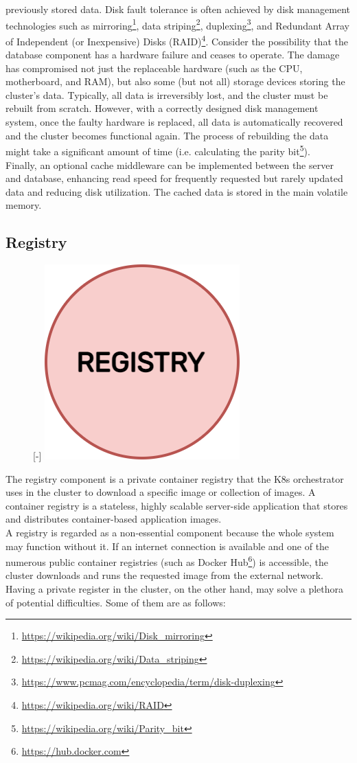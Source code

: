 previously stored data. Disk fault tolerance is often achieved by disk
management technologies such as mirroring\footnote{\url{https://wikipedia.org/wiki/Disk_mirroring}},
data striping\footnote{\url{https://wikipedia.org/wiki/Data_striping}},
duplexing\footnote{\url{https://www.pcmag.com/encyclopedia/term/disk-duplexing}},
and Redundant Array of Independent (or Inexpensive) Disks (RAID)\footnote{\url{https://wikipedia.org/wiki/RAID}}\cite{disk_management_technologies}.
Consider the possibility that the database component has a hardware failure and ceases
to operate. The damage has compromised not just the replaceable hardware (such as
the CPU, motherboard, and RAM), but also some (but not all) storage devices storing
the cluster's data. Typically, all data is irreversibly lost, and the cluster
must be rebuilt from scratch. However, with a correctly designed disk management
system, once the faulty hardware is replaced, all data is automatically
recovered and the cluster becomes functional again. The process of rebuilding the
data might take a significant amount of time (i.e. calculating the parity bit\footnote{\url{https://wikipedia.org/wiki/Parity_bit}}).
\\ %
Finally, an optional cache middleware can be implemented between the server and database,
enhancing read speed for frequently requested but rarely updated data and
reducing disk utilization. The cached data is stored in the main volatile memory.

\subsection{Registry}
\label{subsec:architecture_components_registry}

\begin{figure} %
  \raisebox{0pt}[\dimexpr\height-\baselineskip\relax]{\centering
  \includegraphics[width=.2\textwidth]{images/recluster/registry.png}}
\end{figure}


The registry component is a private container registry that the K8s orchestrator
uses in the cluster to download a specific image or collection of images. A container
registry is a stateless, highly scalable server-side application that stores and
distributes container-based application images\cite{container_registry}. \\ %
A registry is regarded as a non-essential component because the whole system may
function without it. If an internet connection is available and one of the
numerous public container registries (such as Docker Hub\footnote{\url{https://hub.docker.com}})
is accessible, the cluster downloads and runs the requested image from the external
network. Having a private register in the cluster, on the other hand, may solve
a plethora of potential difficulties. Some of them are as follows:

